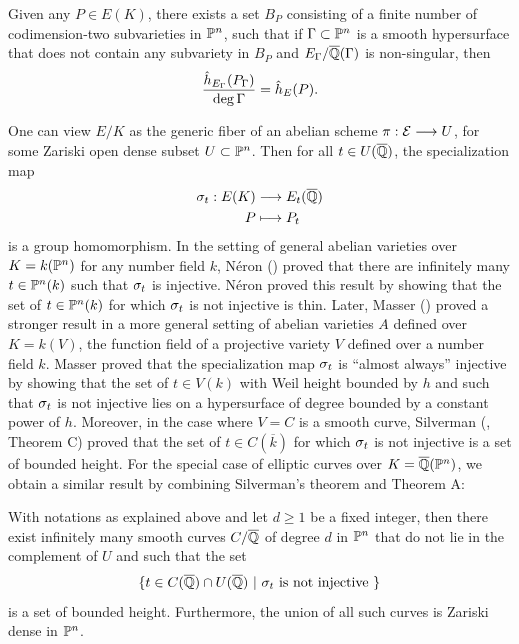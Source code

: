 \documentclass[12pt,reqno]{amsart}
\begin{document}
\begin{theoremA} Given any $P \in E(K)$, there exists a set $B_P$ consisting of a finite number of codimension-two subvarieties in $\mathbb{P}^n$, such that if $\Gamma \subset \mathbb{P}^n$ is a smooth hypersurface that does not contain any subvariety in $B_P$ and $E_\Gamma/\overline{\mathbb{Q}}(\Gamma)$ is non-singular, then
$$\frac{\hat{h}_{E_\Gamma}(P_\Gamma)}{\deg \Gamma}= \hat{h}_E(P). $$
\end{theoremA}

One can view $E/K$ as the generic fiber of an abelian scheme $\pi : {\mathcal E} \longrightarrow U$, for some Zariski open dense subset $U \subset \mathbb{P}^n$. Then for all $t \in U(\overline{\mathbb{Q}})$, the specialization map
\begin{align*}
\sigma_t : E(K) &\longrightarrow E_t(\overline{\mathbb{Q}}) \\
P &\longmapsto P_t
\end{align*} is a group homomorphism. In the setting of general abelian varieties over $K=k(\mathbb{P}^n)$ for any number field $k$, N\'eron (\cite{NPA}) proved that there are infinitely many $t \in \mathbb{P}^n(k)$ such that $\sigma_t$ is injective. N\'eron proved this result by showing that the set of  $t \in \mathbb{P}^n(k)$ for which  $\sigma_t$ is not injective is thin. Later, Masser (\cite{MSF}) proved a stronger result in a more general setting of abelian varieties $A$ defined over $K=k(V)$, the function field of a projective variety $V$ defined over a number field $k$. Masser proved that the specialization map $\sigma_t$ is ``almost always'' injective by showing that the set of $t \in V(k)$ with Weil height bounded by $h$ and such that $\sigma_t$ is not injective lies on a hypersurface of degree bounded by a constant power of $h$. Moreover, in the case where $V=C$ is a smooth curve, Silverman (\cite{SHS}, Theorem C) proved that the set of $t \in C(\overline{k})$ for which $\sigma_t$ is not injective is a set of bounded height. For the special case of elliptic curves over $K=\overline{\mathbb{Q}}(\mathbb{P}^n)$, we obtain a similar result by combining Silverman's theorem and Theorem A:

\begin{theoremB} With notations as explained above and let $d \geq 1$ be a fixed integer, then there exist infinitely many smooth curves $C/\overline{\mathbb{Q}}$ of degree $d$ in $\mathbb{P}^n$ that do not lie in the complement of $U$ and such that the set 
$$\{ t \in C(\overline{\mathbb{Q}}) \cap U(\overline{\mathbb{Q}}) \ | \ \sigma_t \text{ is not injective }\} $$
is a set of bounded height. Furthermore, the union of all such curves is Zariski dense in $\mathbb{P}^n$.
\end{theoremB} 
\end{document}
